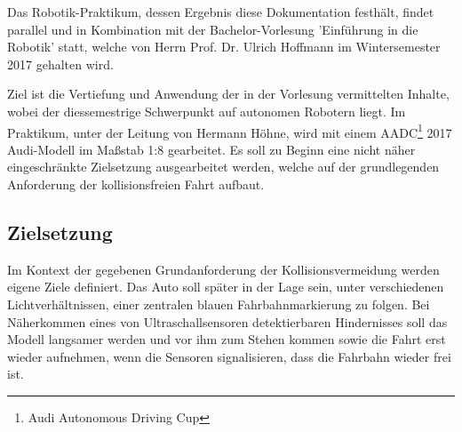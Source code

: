 \documentclass[12pt, a4paper]{scrartcl}
\begin{document}
Das Robotik-Praktikum, dessen Ergebnis diese Dokumentation festhält, findet parallel und in Kombination mit der Bachelor-Vorlesung 'Einführung in die Robotik' statt, welche von Herrn Prof. Dr. Ulrich Hoffmann im Wintersemester 2017 gehalten wird.

Ziel ist die Vertiefung und Anwendung der in der Vorlesung vermittelten Inhalte, wobei der diessemestrige Schwerpunkt  auf autonomen Robotern liegt. Im Praktikum, unter der Leitung von Hermann Höhne, wird mit einem AADC\footnote{Audi Autonomous Driving Cup\cite{aadc-website}} 2017 Audi-Modell im Maßstab 1:8 gearbeitet. Es soll zu Beginn eine nicht näher eingeschränkte Zielsetzung ausgearbeitet werden, welche auf der grundlegenden Anforderung der kollisionsfreien Fahrt aufbaut.

\subsection{Zielsetzung} \label{zielsetzung}

Im Kontext der gegebenen Grundanforderung der Kollisionsvermeidung werden eigene Ziele definiert. Das Auto soll später in der Lage sein, unter verschiedenen Lichtverhältnissen, einer zentralen blauen Fahrbahnmarkierung zu folgen. Bei Näherkommen eines von Ultraschallsensoren detektierbaren Hindernisses soll das Modell langsamer werden und vor ihm zum Stehen kommen sowie die Fahrt erst wieder aufnehmen, wenn die Sensoren signalisieren, dass die Fahrbahn wieder frei ist.
\end{document}
